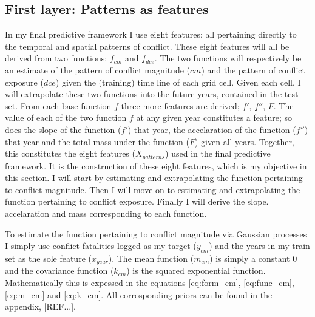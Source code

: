 \documentclass[a4paper]{article}
\begin{document}
\subsection{First layer: Patterns as features}


In my final predictive framework I use eight features; all pertaining directly to the temporal and spatial patterns of conflict. These eight features will all be derived from two functions; $f_{cm}$ and $f_{dce}$. The two functions will respectively be an estimate of the pattern of conflict magnitude ($cm$) and the pattern of conflict exposure ($dce$) given the (training) time line of each grid cell. Given each cell, I will extrapolate these two functions into the future years, contained in the test set. From each base function $f$ three more features are derived; $f'$, $f''$, $F$. The value of each of the two function $f$ at any given year constitutes a feature; so does the slope of the function ($f'$) that year, the accelaration of the function ($f''$) that year and the total mass under the function ($F$) given all years. Together, this constitutes the eight features ($X_{patterns}$) used in the final predictive framework. It is the construction of these eight features, which is my objective in this section. I will start by estimating and extrapolating the function pertaining to conflict magnitude. Then I will move on to estimating and extrapolating the function pertaining to conflict exposure. Finally I will derive the slope. accelaration and mass corresponding to each function.\par

To estimate the function pertaining to conflict magnitude via Gaussian processes I simply use conflict fatalities logged as my target ($y_{cm}$) and the years in my train set as the sole feature ($x_{year}$). The mean function ($m_{cm}$) is simply a constant $0$ and the covariance function ($k_{cm}$) is the squared exponential function. Mathematically this is expessed in the equations \ref{eq:form_cm}, \ref{eq:func_cm}, \ref{eq:m_cm} and \ref{eq:k_cm}. All corrosponding priors can be found in the appendix, [REF...].\par
\end{document}
